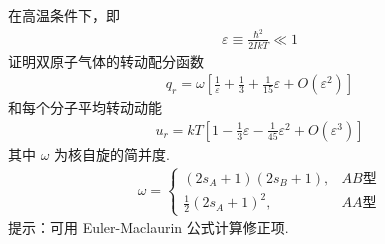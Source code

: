 \documentclass{assignment}
\begin{document}
\begin{prob}
    在高温条件下，即
    \begin{align}
        \varepsilon\equiv\frac{\hbar^2}{2IkT}\ll 1
    \end{align}
    证明双原子气体的转动配分函数
    \begin{align}
        q_r=\omega\left[\frac{1}{\varepsilon}+\frac{1}{3}+\frac{1}{15}\varepsilon+O(\varepsilon^2)\right]
    \end{align}
    和每个分子平均转动动能
    \begin{align}
        u_r=kT\left[1-\frac{1}{3}\varepsilon-\frac{1}{45}\varepsilon^2+O(\varepsilon^3)\right]
    \end{align}
    其中 $\omega$ 为核自旋的简并度.
    \begin{align}
        \omega=\left\{\begin{array}{ll}
            (2s_A+1)(2s_B+1),&AB\text{型}\\
            \frac{1}{2}(2s_A+1)^2,&AA\text{型}
        \end{array}\right.
    \end{align}
    提示：可用 Euler-Maclaurin 公式计算修正项.
\end{prob}
\end{document}
